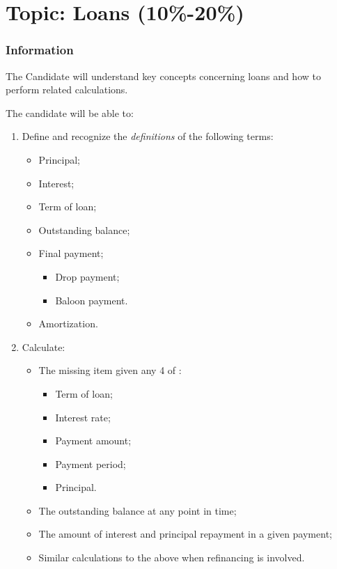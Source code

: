 \chapter[Topic: Loans]{Topic: Loans (10\%-20\%)}

\subsection{Information}

\begin{distributions}[Objective]
The Candidate will understand key concepts concerning loans and how to perform related calculations.
\end{distributions}

\begin{outcomes}
The candidate will be able to:
\begin{enumerate}[label = \alph*)]
	\item	Define and recognize the \textit{definitions} of the following terms:
		\begin{multicols*}{2}
		\begin{itemize}[leftmargin = *]
		\item	Principal;
		\item	Interest;
		\item	Term of loan;
		\item	Outstanding balance;
		\item	Final payment;
			\begin{itemize}
			\item	Drop payment;
			\item	Baloon payment.
			\end{itemize}
		\item	Amortization.
		\end{itemize}
		\end{multicols*}
	\item	Calculate:
		\begin{itemize}[leftmargin = *]
		\item	The missing item given any 4 of :
			\begin{multicols*}{2}
			\begin{itemize}[leftmargin = *]
			\item	Term of loan;
			\item	Interest rate;
			\item	Payment amount;
			\item	Payment period;
			\item	Principal.
			\end{itemize}
			\end{multicols*}
		\item	The outstanding balance at any point in time;
		\item	The amount of interest and principal repayment in a given payment;
		\item	Similar calculations to the above when refinancing is involved.
		\end{itemize}
\end{enumerate}
\end{outcomes}

